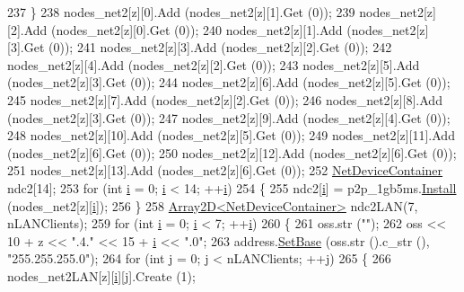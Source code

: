 \begin{DoxyCode}
237         \}
238       nodes\_net2[z][0].Add (nodes\_net2[z][1].Get (0));
239       nodes\_net2[z][2].Add (nodes\_net2[z][0].Get (0));
240       nodes\_net2[z][1].Add (nodes\_net2[z][3].Get (0));
241       nodes\_net2[z][3].Add (nodes\_net2[z][2].Get (0));
242       nodes\_net2[z][4].Add (nodes\_net2[z][2].Get (0));
243       nodes\_net2[z][5].Add (nodes\_net2[z][3].Get (0));
244       nodes\_net2[z][6].Add (nodes\_net2[z][5].Get (0));
245       nodes\_net2[z][7].Add (nodes\_net2[z][2].Get (0));
246       nodes\_net2[z][8].Add (nodes\_net2[z][3].Get (0));
247       nodes\_net2[z][9].Add (nodes\_net2[z][4].Get (0));
248       nodes\_net2[z][10].Add (nodes\_net2[z][5].Get (0));
249       nodes\_net2[z][11].Add (nodes\_net2[z][6].Get (0));
250       nodes\_net2[z][12].Add (nodes\_net2[z][6].Get (0));
251       nodes\_net2[z][13].Add (nodes\_net2[z][6].Get (0));
252       \hyperlink{classns3_1_1NetDeviceContainer}{NetDeviceContainer} ndc2[14];
253       \textcolor{keywordflow}{for} (\textcolor{keywordtype}{int} \hyperlink{bernuolliDistribution_8m_a6f6ccfcf58b31cb6412107d9d5281426}{i} = 0; \hyperlink{bernuolliDistribution_8m_a6f6ccfcf58b31cb6412107d9d5281426}{i} < 14; ++\hyperlink{bernuolliDistribution_8m_a6f6ccfcf58b31cb6412107d9d5281426}{i}) 
254         \{
255           ndc2[\hyperlink{bernuolliDistribution_8m_a6f6ccfcf58b31cb6412107d9d5281426}{i}] = p2p\_1gb5ms.\hyperlink{classns3_1_1PointToPointHelper_ab9162fea3e88722666fed1106df1f9ec}{Install} (nodes\_net2[z][\hyperlink{bernuolliDistribution_8m_a6f6ccfcf58b31cb6412107d9d5281426}{i}]);
256         \}
258       \hyperlink{classArray2D}{Array2D<NetDeviceContainer>} ndc2LAN(7, nLANClients);
259       \textcolor{keywordflow}{for} (\textcolor{keywordtype}{int} \hyperlink{bernuolliDistribution_8m_a6f6ccfcf58b31cb6412107d9d5281426}{i} = 0; \hyperlink{bernuolliDistribution_8m_a6f6ccfcf58b31cb6412107d9d5281426}{i} < 7; ++\hyperlink{bernuolliDistribution_8m_a6f6ccfcf58b31cb6412107d9d5281426}{i}) 
260         \{
261           oss.str (\textcolor{stringliteral}{""});
262           oss << 10 + z << \textcolor{stringliteral}{".4."} << 15 + \hyperlink{bernuolliDistribution_8m_a6f6ccfcf58b31cb6412107d9d5281426}{i} << \textcolor{stringliteral}{".0"};
263           address.\hyperlink{classns3_1_1Ipv4AddressHelper_acf7b16dd25bac67e00f5e25f90a9a035}{SetBase} (oss.str ().c\_str (), \textcolor{stringliteral}{"255.255.255.0"});
264           \textcolor{keywordflow}{for} (\textcolor{keywordtype}{int} j = 0; j < nLANClients; ++j) 
265             \{
266               nodes\_net2LAN[z][\hyperlink{bernuolliDistribution_8m_a6f6ccfcf58b31cb6412107d9d5281426}{i}][j].Create (1);

\end{DoxyCode}

